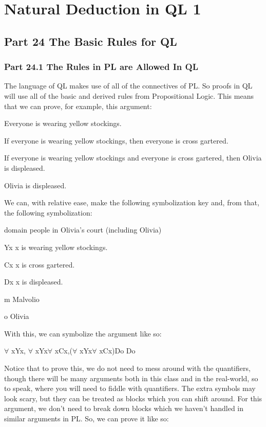 \part{Natural Deduction in QL 1}
\label{ch.qlnd1}
\chapter{Part 24 The Basic Rules for QL}
\section{Part 24.1 The Rules in PL are Allowed In QL}
The language of QL makes use of all of the connectives of PL. So proofs in QL will use all of the basic and derived rules from Propositional Logic. This means that we can prove, for example, this argument:
\begin{earg}
\item[]Everyone is wearing yellow stockings.
\item[]If everyone is wearing yellow stockings, then everyone is cross gartered.
\item[]If everyone is wearing yellow stockings and everyone is cross gartered, then Olivia is displeased.
\item[\therefore] Olivia is displeased.
\end{earg}
We can, with relative ease, make the following symbolization key and, from that, the following symbolization:
\begin{ekey}
\item[domain] people in Olivia's court (including Olivia)
\item[Yx] x is wearing yellow stockings.
\item[Cx] x is cross gartered.
\item[Dx] x is displeased.
\item[m] Malvolio
\item[o] Olivia
\end{ekey}
With this, we can symbolize the argument like so:
\begin{center}
$\forall$ xYx, $\forall$ xYx\eif $\forall$ xCx,($\forall$ xYx\eand $\forall$ xCx)\eif Do \therefore Do
\end{center}
Notice that to prove this, we do not need to mess around with the quantifiers, though there will be many arguments both in this class and in the real-world, so to speak, where you will need to fiddle with quantifiers. The extra symbols may look scary, but they can be treated as blocks which you can shift around. For this argument, we don't need to break down blocks which we haven't handled in similar arguments in PL. So, we can prove it like so:
\begin{fitchproof}
\end{fitchproof}	

